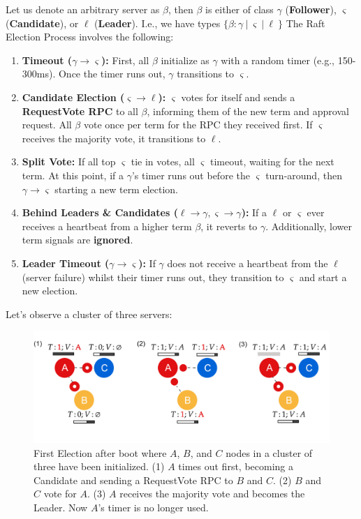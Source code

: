 \begin{Def}

    Let us denote an arbitrary server as $\beta$, then $\beta$ is either of class $\gamma$ (\textbf{Follower}), $\varsigma$ (\textbf{Candidate}), or $\ell$ (\textbf{Leader}). 
    I.e., we have types $\{\beta: \gamma\ |\ \varsigma\ |\ \ell\ \}$ The Raft Election Process involves the following:
    \begin{enumerate}
        \item \textbf{Timeout ($\gamma\to\varsigma$):} First, all $\beta$ initialize as $\gamma$ with a random timer (e.g., 150-300ms). 
        Once the timer runs out, $\gamma$ transitions to $\varsigma$.
        \item \textbf{Candidate Election ($\varsigma\to\ell$):} $\varsigma$ votes for itself and sends a \textbf{RequestVote RPC} to all $\beta$, informing them of the new term and approval request.
        All $\beta$ vote once per term for the RPC they received first. If $\varsigma$ receives the majority vote, it transitions to $\ell$.
        \item \textbf{Split Vote:} If all top $\varsigma$ tie in votes, all $\varsigma$ timeout, waiting for the next term. At this point, if a $\gamma$'s timer runs out before the $\varsigma$ turn-around, then $\gamma\to\varsigma$ starting a new term election.
        \item \textbf{Behind Leaders \& Candidates ($\ell\to\gamma,\varsigma\to\gamma$):} If a $\ell$ or $\varsigma$ ever receives a heartbeat from a higher term $\beta$, it reverts to $\gamma$. Additionally, 
        lower term signals are \textbf{ignored}.
        \item \textbf{Leader Timeout ($\gamma\to\varsigma$):} If $\gamma$ does not receive a heartbeat from the $\ell$ (server failure) whilst their timer runs out, they transition to $\varsigma$ and start a new election.
    \end{enumerate}
\end{Def}

\noindent
Let's observe a cluster of three servers:
\begin{figure}[h]
    \centering
    \includegraphics[width=\textwidth]{Sections/raft/election.png}
    \caption{First Election after boot where $A$, $B$, and $C$ nodes in a cluster of three have been initialized. 
    (1) $A$ times out first, becoming a Candidate and sending a RequestVote RPC to $B$ and $C$. (2) $B$ and $C$ vote for $A$.
    (3) $A$ receives the majority vote and becomes the Leader. Now $A$'s timer is no longer used.}
\end{figure}

